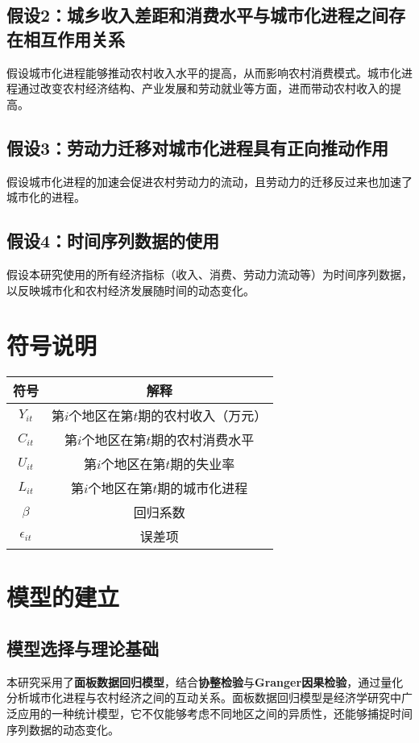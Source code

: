 \documentclass[12pt]{article}
\begin{document}
\subsection{假设2：城乡收入差距和消费水平与城市化进程之间存在相互作用关系}
假设城市化进程能够推动农村收入水平的提高，从而影响农村消费模式。城市化进程通过改变农村经济结构、产业发展和劳动就业等方面，进而带动农村收入的提高。

\subsection{假设3：劳动力迁移对城市化进程具有正向推动作用}
假设城市化进程的加速会促进农村劳动力的流动，且劳动力的迁移反过来也加速了城市化的进程。

\subsection{假设4：时间序列数据的使用}
假设本研究使用的所有经济指标（收入、消费、劳动力流动等）为时间序列数据，以反映城市化和农村经济发展随时间的动态变化。

\newpage

\section{符号说明}

\begin{tabular}{|c|c|}
\hline
\textbf{符号} & \textbf{解释} \\
\hline
$Y_{it}$ & 第$i$个地区在第$t$期的农村收入（万元） \\
$C_{it}$ & 第$i$个地区在第$t$期的农村消费水平 \\
$U_{it}$ & 第$i$个地区在第$t$期的失业率 \\
$L_{it}$ & 第$i$个地区在第$t$期的城市化进程 \\
$\beta$ & 回归系数 \\
$\epsilon_{it}$ & 误差项 \\
\hline
\end{tabular}

\newpage

\section{模型的建立}

\subsection{模型选择与理论基础}
本研究采用了\textbf{面板数据回归模型}，结合\textbf{协整检验}与\textbf{Granger因果检验}，通过量化分析城市化进程与农村经济之间的互动关系。面板数据回归模型是经济学研究中广泛应用的一种统计模型，它不仅能够考虑不同地区之间的异质性，还能够捕捉时间序列数据的动态变化。
\end{document}
